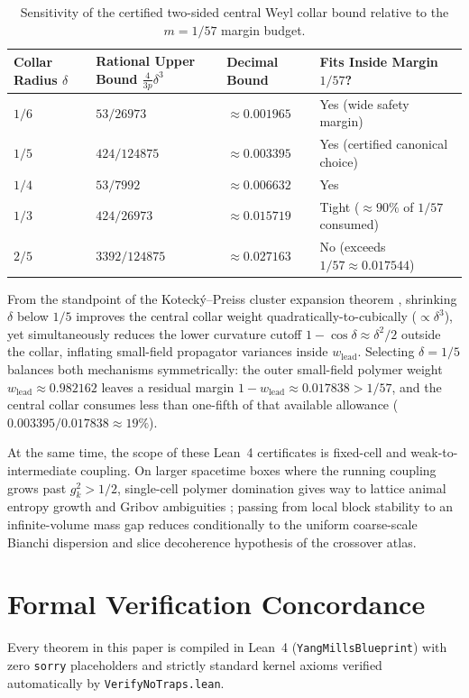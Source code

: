 \documentclass[11pt,a4paper]{article}
\begin{document}
\begin{table}[ht]
\centering
\small
\begin{tabular}{@{}llll@{}}
\toprule
Collar Radius $\delta$ & Rational Upper Bound $\frac{4}{3p}\delta^3$ & Decimal Bound & Fits Inside Margin $1/57$? \\
\midrule
$1/6$ & $53 / 26973$ & $\approx 0.001965$ & Yes (wide safety margin) \\
$1/5$ & $424 / 124875$ & $\approx 0.003395$ & Yes (certified canonical choice) \\
$1/4$ & $53 / 7992$ & $\approx 0.006632$ & Yes \\
$1/3$ & $424 / 26973$ & $\approx 0.015719$ & Tight ($\approx 90\%$ of $1/57$ consumed) \\
$2/5$ & $3392 / 124875$ & $\approx 0.027163$ & No (exceeds $1/57 \approx 0.017544$) \\
\bottomrule
\end{tabular}
\caption{Sensitivity of the certified two-sided central Weyl collar bound relative to the $m = 1/57$ margin budget.}
\label{tab:collar-sensitivity}
\end{table}

From the standpoint of the Koteck\'y--Preiss cluster expansion theorem \cite{KoteckyPreiss1986}, shrinking $\delta$ below $1/5$ improves the central collar weight quadratically-to-cubically ($\propto \delta^3$), yet simultaneously reduces the lower curvature cutoff $1 - \cos\delta \approx \delta^2 / 2$ outside the collar, inflating small-field propagator variances inside $w_{\mathrm{lead}}$. Selecting $\delta = 1/5$ balances both mechanisms symmetrically: the outer small-field polymer weight $w_{\mathrm{lead}} \approx 0.982162$ leaves a residual margin $1 - w_{\mathrm{lead}} \approx 0.017838 > 1/57$, and the central collar consumes less than one-fifth of that available allowance ($0.003395 / 0.017838 \approx 19\%$).

At the same time, the scope of these Lean~4 certificates is fixed-cell and weak-to-intermediate coupling. On larger spacetime boxes where the running coupling grows past $g_k^2 > 1/2$, single-cell polymer domination gives way to lattice animal entropy growth and Gribov ambiguities \cite{Gribov1978,Balaban1989CMP122}; passing from local block stability to an infinite-volume mass gap reduces conditionally to the uniform coarse-scale Bianchi dispersion and slice decoherence hypothesis of the crossover atlas.

\section{Formal Verification Concordance}
Every theorem in this paper is compiled in Lean~4 (\texttt{YangMillsBlueprint}) with zero \texttt{sorry} placeholders and strictly standard kernel axioms verified automatically by \texttt{VerifyNoTraps.lean}.
\end{document}
